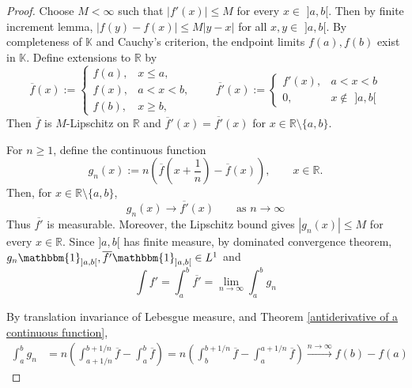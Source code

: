 \documentclass[11pt, a4paper, openany]{book}
\theoremstyle{definition}
\begin{document}
    \begin{proof}
        Choose $M<\infty$ such that $|f'(x)|\leqslant M$ for
        every $x\in \,\,]a,b[$. Then by finite increment lemma, $|f(y)-f(x)|\leqslant M|y-x|$ for all $x,y\in\,\,]a,b[$. By completeness of $\mathbb{K}$ and Cauchy's criterion, the endpoint limits $f(a),f(b)$ exist in $\mathbb{K}$. Define extensions to $\mathbb{R}$ by
        \[
            \overline{f}(x):=
            \begin{cases}
                f(a),&x\leqslant a,\\
                f(x),&a< x< b,\\
                f(b),&x\geqslant b,
            \end{cases}
            \qquad
            \overline{f'}(x):=
            \begin{cases}
                f'(x),&a<x<b\\
                0,&x\notin \,\,]a,b[
            \end{cases}
        \]
        Then $\overline f$ is $M$-Lipschitz on $\mathbb{R}$ and $\overline f'(x)=\overline{f'}(x)$ for $x\in \mathbb{R}\setminus\{a,b\}$.
    
        For $n\geqslant1$, define the continuous function
        \[
            g_n(x):=
            n\left(\overline f\left(x+\frac1n\right)
            -\overline f(x)\right),
            \qquad x\in\mathbb{R}.
        \]
        Then, for $x\in\mathbb{R}\setminus\{a,b\}$,
        \[
            g_n(x)\to\overline{f'}(x)\qquad \text{as }n\to\infty
        \]
        Thus $\overline{f'}$ is measurable. Moreover, the Lipschitz
        bound gives $|g_n(x)|\leqslant M$ for every $x\in\mathbb{R}$.
        Since $]a,b[$ has finite measure, by dominated convergence theorem, $g_n\mathbbm{1}_{]a,b[},\overline{f'}\mathbbm{1}_{]a,b[}\in L^1$ and
        \[
            \int f'
            =\int_a^b\overline{f'}
            =\lim_{n\to\infty}\int_a^b g_n
        \]
    
        By translation invariance of Lebesgue measure, and Theorem \ref{antiderivative of a continuous function},
        \begin{align*}
            \int_a^b g_n&=n\left(
                \int_{a+1/n}^{b+1/n}\overline f
                -\int_a^b\overline f
            \right)=n\left(\int_b^{b+1/n}\overline f-\int_a^{a+1/n}\overline f\right)\overset{n\to\infty}{\longrightarrow} f(b)-f(a)
        \end{align*}
    \end{proof}
\end{document}
